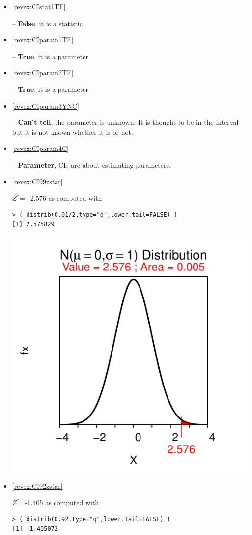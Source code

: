 \documentclass[10pt,openany]{book}\usepackage[]{graphicx}\usepackage[]{color}
\makeatletter
\newenvironment{kframe}{%
 \def\at@end@of@kframe{}%
 \ifinner\ifhmode%
  \def\at@end@of@kframe{\end{minipage}}%
  \begin{minipage}{\columnwidth}%
 \fi\fi%
 \def\FrameCommand##1{\hskip\@totalleftmargin \hskip-\fboxsep
 \colorbox{shadecolor}{##1}\hskip-\fboxsep
     \hskip-\linewidth \hskip-\@totalleftmargin \hskip\columnwidth}%
 \MakeFramed {\advance\hsize-\width
   \@totalleftmargin\z@ \linewidth\hsize
   \@setminipage}}%
 {\par\unskip\endMakeFramed%
 \at@end@of@kframe}
\newenvironment{knitrout}{}{} %
\makeatother
\begin{document}
\begin{itemize}
  \item \hypertarget{ans:CIstat1TF}{\ref{revex:CIstat1TF}} -- \textbf{False}, it is a statistic
  \item \hypertarget{ans:CIparam1TF}{\ref{revex:CIparam1TF}} -- \textbf{True}, it is a parameter
  \item \hypertarget{ans:CIparam2TF}{\ref{revex:CIparam2TF}} -- \textbf{True}, it is a parameter
  \item \hypertarget{ans:CIparam3YNC}{\ref{revex:CIparam3YNC}} -- \textbf{Can't tell}, the parameter is unknown.  It is thought to be in the interval but it is not known whether it is or not.
  \item \hypertarget{ans:CIparam4C}{\ref{revex:CIparam4C}} -- \textbf{Parameter}, CIs are about estimating parameters.

  \item \hypertarget{ans:CI99zstar}{\ref{revex:CI99zstar}} $Z^{*}$=$\pm$2.576 as computed with
\begin{knitrout}
\color{fgcolor}\begin{kframe}
\begin{verbatim}
> ( distrib(0.01/2,type="q",lower.tail=FALSE) )
[1] 2.575829
\end{verbatim}
\end{kframe}

{\centering \includegraphics[width=.4\linewidth]{Figs/unnamed-chunk-327-1} 

}



\end{knitrout}
  \item \hypertarget{ans:CI92zstar}{\ref{revex:CI92zstar}} $Z^{*}$=-1.405 as computed with
\begin{knitrout}
\color{fgcolor}\begin{kframe}
\begin{verbatim}
> ( distrib(0.92,type="q",lower.tail=FALSE) )
[1] -1.405072
\end{verbatim}
\end{kframe}


\end{knitrout}
\end{itemize}
\end{document}
